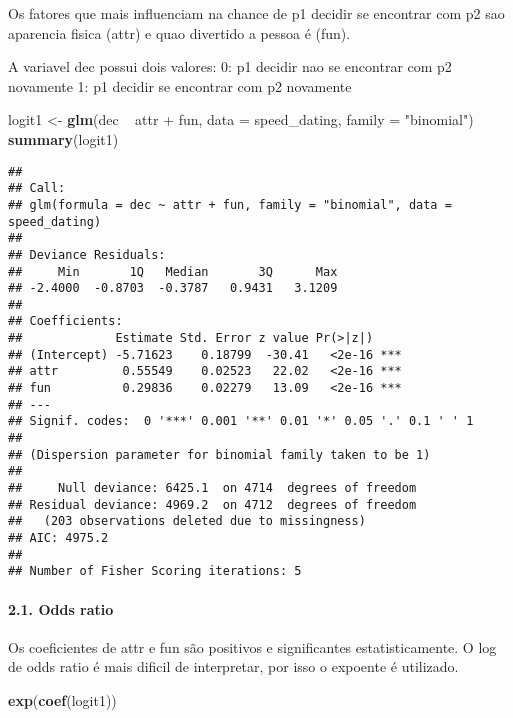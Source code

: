\documentclass[]{article}
\newenvironment{Shaded}{\begin{snugshade}}{\end{snugshade}}
\newcommand{\KeywordTok}[1]{\textcolor[rgb]{0.13,0.29,0.53}{\textbf{{#1}}}}
\newcommand{\DataTypeTok}[1]{\textcolor[rgb]{0.13,0.29,0.53}{{#1}}}
\newcommand{\StringTok}[1]{\textcolor[rgb]{0.31,0.60,0.02}{{#1}}}
\newcommand{\NormalTok}[1]{{#1}}
\let\oldparagraph\paragraph
\renewcommand{\paragraph}[1]{\oldparagraph{#1}\mbox{}}
\begin{document}
Os fatores que mais influenciam na chance de p1 decidir se encontrar com
p2 sao aparencia fisica (attr) e quao divertido a pessoa é (fun).

A variavel dec possui dois valores: 0: p1 decidir nao se encontrar com
p2 novamente 1: p1 decidir se encontrar com p2 novamente

\begin{Shaded}
\begin{Highlighting}[]
\NormalTok{logit1 <-}\StringTok{ }\KeywordTok{glm}\NormalTok{(dec ~}\StringTok{ }\NormalTok{attr +}\StringTok{ }\NormalTok{fun, }\DataTypeTok{data =} \NormalTok{speed_dating, }\DataTypeTok{family =} \StringTok{"binomial"}\NormalTok{)}
\KeywordTok{summary}\NormalTok{(logit1)}
\end{Highlighting}
\end{Shaded}

\begin{verbatim}
## 
## Call:
## glm(formula = dec ~ attr + fun, family = "binomial", data = speed_dating)
## 
## Deviance Residuals: 
##     Min       1Q   Median       3Q      Max  
## -2.4000  -0.8703  -0.3787   0.9431   3.1209  
## 
## Coefficients:
##             Estimate Std. Error z value Pr(>|z|)    
## (Intercept) -5.71623    0.18799  -30.41   <2e-16 ***
## attr         0.55549    0.02523   22.02   <2e-16 ***
## fun          0.29836    0.02279   13.09   <2e-16 ***
## ---
## Signif. codes:  0 '***' 0.001 '**' 0.01 '*' 0.05 '.' 0.1 ' ' 1
## 
## (Dispersion parameter for binomial family taken to be 1)
## 
##     Null deviance: 6425.1  on 4714  degrees of freedom
## Residual deviance: 4969.2  on 4712  degrees of freedom
##   (203 observations deleted due to missingness)
## AIC: 4975.2
## 
## Number of Fisher Scoring iterations: 5
\end{verbatim}

\paragraph{2.1. Odds ratio}\label{odds-ratio}

Os coeficientes de attr e fun são positivos e significantes
estatisticamente. O log de odds ratio é mais dificil de interpretar, por
isso o expoente é utilizado.

\begin{Shaded}
\begin{Highlighting}[]
\KeywordTok{exp}\NormalTok{(}\KeywordTok{coef}\NormalTok{(logit1))}
\end{Highlighting}
\end{Shaded}
\end{document}
